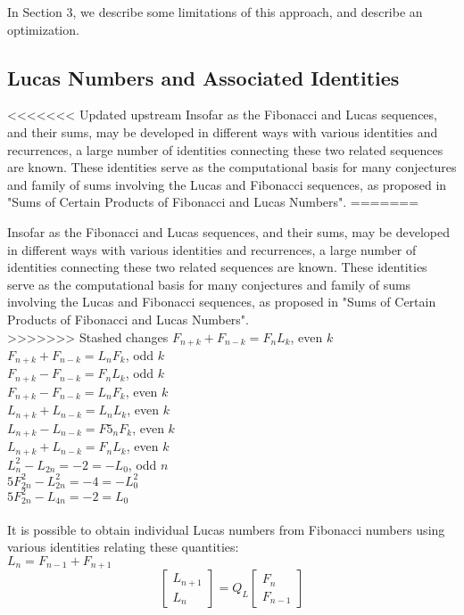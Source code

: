 \documentclass[11pt]{article}
\begin{document}
In Section 3, we describe some limitations of this approach, and describe an optimization.

\subsection{Lucas Numbers and Associated Identities}
<<<<<<< Updated upstream
Insofar as the Fibonacci and Lucas sequences, and their sums, may be developed in different ways with various identities and recurrences, a large number of identities connecting these two related sequences are known. These identities serve as the computational basis for many conjectures and family of sums involving the Lucas and Fibonacci sequences, as proposed in "Sums of Certain Products of Fibonacci and Lucas Numbers". 
=======

Insofar as the Fibonacci and Lucas sequences, and their sums, may be developed in different ways with various identities and recurrences, a large number of identities connecting these two related sequences are known. These identities serve as the computational basis for many conjectures and family of sums involving the Lucas and Fibonacci sequences, as proposed in "Sums of Certain Products of Fibonacci and Lucas Numbers". \\
>>>>>>> Stashed changes
$F_{n+k} + F_{n-k} = F_{n}L_{k}$, even $k$\\
$F_{n+k} + F_{n-k} = L_{n}F_{k}$, odd $k$\\$F_{n+k} - F_{n-k} = F_{n}L_{k}$, odd $k$ \\ $F_{n+k} - F_{n-k} = L_{n}F_{k}$, even $k$ \\ $L_{n+k} + L_{n-k} = L_{n}L_{k}$, even $k$ \\ $L_{n+k} - L_{n-k}= F5_{n}F_{k}$, even $k$ \\ $L_{n+k} + L_{n-k} = F_{n}L_{k}$, even $k$\\ $L_{n}^{2} - L_{2n} = -2 = -L_{0}$, odd $n$\\ $5F_{2n}^{2} - L_{2n}^{2} = -4 = -L_{0}^{2}$\\ $5F_{2n}^{2} - L_{4n} = -2 = L_{0}$\\\\  It is possible to obtain individual Lucas numbers from Fibonacci numbers using various identities relating these quantities:\\$L_{n} = F_{n-1} + F_{n+1}$ \\ 
\[
\begin{bmatrix}
L_{n+1} \\
L_{n}
\end{bmatrix} = Q_{L} \begin{bmatrix} F_{n} \\ F_{n-1}\end{bmatrix}
\] 
\end{document}
